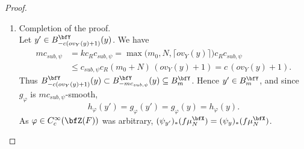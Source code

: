 \documentclass[12pt,a4paper]{amsart}%
\newcommand{\RamiA}[1]{{{#1}}}
\begin{document}
{\begin{proof}
\begin{enumerate}[{Step} 1.]
    As $\varphi\circ\psi$ is locally constant and $\operatorname{supp}f$ is compact, $h_\varphi$ is locally constant on $Y$; by \eqref{eq:prod.rect} and the $m\RamiA{c_{sub,\psi}}$-smoothness of $g$, the function $g_\varphi$ is $m\RamiA{c_{sub,\psi}}$-smooth. Since $\psi$ preserves the $\bfY$-coordinate, for every $\eta\in C_c^\infty(B_m^{\bfY})$, using $\mu_m^{\bfY}=\mu_{m\RamiA{c_{sub,\psi}}}^{\bfY}$ on $B_m^{\bfY}$ (as $m\RamiA{c_{sub,\psi}}\geq m$),
    \begin{align*}
    \int_{\bfY} h_\varphi\,\eta\,\mu_m^{\bfY}
    &=\int_{\bfZ\times\bfY}(\varphi\boxtimes\eta)\,\psi_*\bigl(f\mu_N^{\bfX}\boxtimes\mu_m^{\bfY}\bigr)\\
    &\overset{\eqref{eq:fiber.push}}{=}\int_{\bfY} g_\varphi\,\eta\,\mu_{m\RamiA{c_{sub,\psi}}}^{\bfY}
    =\int_{\bfY} g_\varphi\,\eta\,\mu_m^{\bfY}.
    \end{align*}
    The density of $\mu_m^{\bfY}$ is strictly positive on $B_m^{\bfY}$, so $h_\varphi=g_\varphi$ almost everywhere on $B_m^{\bfY}$; as both are locally constant, $h_\varphi=g_\varphi$ on all of $B_m^{\bfY}$.
\item Completion of the proof.\\
Let $y'\in B_{-c(ov_Y(y)+1)}^{\bfY}(y)$. We have      \begin{equation*}\label{eq:m.bound}
     \begin{split}
     m{c_{sub,\psi}}&=k c_R {c_{sub,\psi}}=
     \max\bigl(m_0,N,\lceil ov_Y(y)\rceil\bigr) c_R {c_{sub,\psi}}\\
     &\leq c_{sub,\psi}c_R(m_0+N)\,(ov_Y(y)+1) =  c\,(ov_Y(y)+1).
     \end{split}
    \end{equation*}
Thus $B_{-c(ov_Y(y)+1)}^{\bfY}(y) \subset  B_{-m\RamiA{c_{sub,\psi}}}^{\bfY}(y) \subseteq B_m^{\bfY}$. Hence $y'\in B_m^{\bfY}$, and since $g_\varphi$ is $m\RamiA{c_{sub,\psi}}$-smooth,
    $$h_\varphi(y')=g_\varphi(y')=g_\varphi(y)=h_\varphi(y).$$
    As $\varphi\in C_c^\infty(\bfZ(F))$ was arbitrary, $(\psi_{y'})_*(f\mu_N^{\bfX})=(\psi_y)_*(f\mu_N^{\bfX})$.
\end{enumerate}
\end{proof}
}
\end{document}
